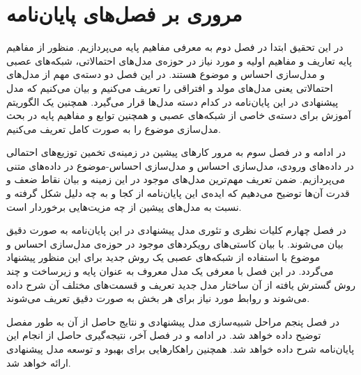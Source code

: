 \section{مروری بر فصل‌های پایان‌نامه}
در این تحقیق ابتدا در فصل دوم به معرفی‌ مفاهیم پایه می‌‌پردازیم. منظور از مفاهیم پایه ‌تعاریف و مفاهیم اولیه‌ و مورد نیاز در حوزه‌ی مدل‌های احتمالاتی، شبکه‌های عصبی و مدل‌سازی احساس و موضوع هستند. در این فصل دو دسته‌ی مهم از مدل‌های احتمالاتی یعنی‌ مدل‌های مولد و افتراقی را تعریف می‌‌کنیم و بیان می‌کنیم که مدل پیشنهادی در این پایان‌‌نامه در کدام دسته‌ مدل‌ها قرار می‌گیرد. همچنین یک الگوریتم آموزش برای دسته‌ی خاصی‌ از شبکه‌های عصبی و همچنین توابع و مفاهیم پایه در بحث مدل‌سازی موضوع را به صورت کامل تعریف می‌کنیم.

در ادامه و در فصل سوم به مرور کارهای پیشین در زمینه‌ی تخمین توزیع‌های احتمالی‌ در داده‌های ورودی، مدل‌سازی احساس و مدل‌سازی احساس‌-موضوع در داده‌های متنی می‌‌پردازیم. ضمن تعریف مهم‌ترین مدل‌های موجود در این زمینه و بیان نقاط ضعف و قدرت آن‌ها توضیح می‌‌دهیم که ایده‌ی این پایان‌‌نامه از کجا و به چه دلیل شکل گرفته و نسبت به مدل‌های پیشین از چه مزیت‌هایی برخوردار است.

در فصل چهارم کلیات نظری و تئوری مدل پیشنهادی در این پایان‌‌نامه به صورت دقیق بیان می‌‌شوند. با بیان کاستی‌های رویکردهای موجود در حوزه‌ی مدل‌سازی احساس و موضوع با استفاده از شبکه‌های عصبی یک روش جدید برای این منظور پیشنهاد می‌‌گردد. در این فصل با معرفی‌ یک مدل معروف به عنوان پایه و زیرساخت و چند روش گسترش یافته از آن ساختار مدل جدید تعریف و قسمت‌های مختلف آن شرح داده می‌‌شوند و روابط مورد نیاز برای هر بخش به صورت دقیق تعریف می‌‌شوند.

 در فصل پنجم مراحل شبیه‌سازی مدل پیشنهادی و نتایج حاصل از آن به طور مفصل توضیح داده خواهد شد.
 در ادامه و در فصل آخر، نتیجه‌گیری حاصل از انجام این پایان‌‌نامه شرح داده خواهد شد. همچنین راهکارهایی برای بهبود و توسعه مدل پیشنهادی ارائه خواهد شد.
\thispagestyle{empty} 













